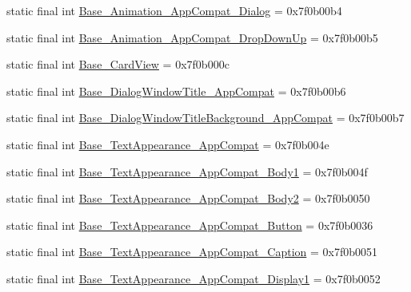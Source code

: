 \begin{CompactItemize}
\item 
static final int \hyperlink{classandroid_1_1support_1_1graphics_1_1drawable_1_1animated_1_1_r_1_1style_bf9d42fd2e4f242ac0257c7b42cc76dd}{Base\_\-Animation\_\-AppCompat\_\-Dialog} = 0x7f0b00b4
\item 
static final int \hyperlink{classandroid_1_1support_1_1graphics_1_1drawable_1_1animated_1_1_r_1_1style_d013cb3adddbe3f9f3981577f779d687}{Base\_\-Animation\_\-AppCompat\_\-DropDownUp} = 0x7f0b00b5
\item 
static final int \hyperlink{classandroid_1_1support_1_1graphics_1_1drawable_1_1animated_1_1_r_1_1style_b237830de4ea6dcf474a5805b18a582c}{Base\_\-CardView} = 0x7f0b000c
\item 
static final int \hyperlink{classandroid_1_1support_1_1graphics_1_1drawable_1_1animated_1_1_r_1_1style_e16d928c8074bc7051a257399d9b32f5}{Base\_\-DialogWindowTitle\_\-AppCompat} = 0x7f0b00b6
\item 
static final int \hyperlink{classandroid_1_1support_1_1graphics_1_1drawable_1_1animated_1_1_r_1_1style_438dc4f6d2ef680182992202463fbc99}{Base\_\-DialogWindowTitleBackground\_\-AppCompat} = 0x7f0b00b7
\item 
static final int \hyperlink{classandroid_1_1support_1_1graphics_1_1drawable_1_1animated_1_1_r_1_1style_961f52aae31c6e25ca0088734d2b710a}{Base\_\-TextAppearance\_\-AppCompat} = 0x7f0b004e
\item 
static final int \hyperlink{classandroid_1_1support_1_1graphics_1_1drawable_1_1animated_1_1_r_1_1style_c1998596cfc34f75b56fcc01c2c0c062}{Base\_\-TextAppearance\_\-AppCompat\_\-Body1} = 0x7f0b004f
\item 
static final int \hyperlink{classandroid_1_1support_1_1graphics_1_1drawable_1_1animated_1_1_r_1_1style_85f6dd537471577de73c71cac6f4d10a}{Base\_\-TextAppearance\_\-AppCompat\_\-Body2} = 0x7f0b0050
\item 
static final int \hyperlink{classandroid_1_1support_1_1graphics_1_1drawable_1_1animated_1_1_r_1_1style_2b31ec60ee81c1bd46b801617a09c65d}{Base\_\-TextAppearance\_\-AppCompat\_\-Button} = 0x7f0b0036
\item 
static final int \hyperlink{classandroid_1_1support_1_1graphics_1_1drawable_1_1animated_1_1_r_1_1style_a1b990fd0816b0a86514ff9b2c0e8d74}{Base\_\-TextAppearance\_\-AppCompat\_\-Caption} = 0x7f0b0051
\item 
static final int \hyperlink{classandroid_1_1support_1_1graphics_1_1drawable_1_1animated_1_1_r_1_1style_1c0cda54bb30fb31dcb8518e0eb26e1f}{Base\_\-TextAppearance\_\-AppCompat\_\-Display1} = 0x7f0b0052

\end{CompactItemize}
